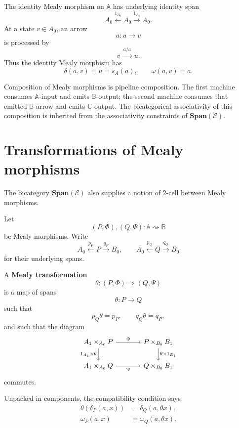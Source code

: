 The identity Mealy morphism on \(\mathbb A\) has underlying identity span
\[
A_0\xleftarrow{1_{A_0}}A_0\xrightarrow{1_{A_0}}A_0.
\]
At a state \(v\in A_0\), an arrow
\[
a:u\to v
\]
is processed by
\[
v
\xrightarrow{\;a/a\;}
u.
\]
Thus the identity Mealy morphism has
\[
\delta(a,v)=u=s_A(a),
\qquad
\omega(a,v)=a.
\]

\begin{remark}
\label{rem:pipeline-composition}
Composition of Mealy morphisms is pipeline composition. The first machine consumes \(\mathbb A\)-input and emits \(\mathbb B\)-output; the second machine consumes that emitted \(\mathbb B\)-arrow and emits \(\mathbb C\)-output. The bicategorical associativity of this composition is inherited from the associativity constraints of \(\mathbf{Span}(\mathcal E)\).
\end{remark}

\section{Transformations of Mealy morphisms}
\label{sec:transformations-of-mealy-morphisms}

The bicategory \(\mathbf{Span}(\mathcal E)\) also supplies a notion of 2-cell between Mealy morphisms.

Let
\[
(P,\Phi),(Q,\Psi):\mathbb A\rightsquigarrow\mathbb B
\]
be Mealy morphisms. Write
\[
A_0\xleftarrow{p_P}P\xrightarrow{q_P}B_0,
\qquad
A_0\xleftarrow{p_Q}Q\xrightarrow{q_Q}B_0
\]
for their underlying spans.

\begin{definition}
\label{def:mealy-transformation}
A \textbf{Mealy transformation}
\[
\theta:(P,\Phi)\Rightarrow(Q,\Psi)
\]
is a map of spans
\[
\theta:P\to Q
\]
such that
\[
p_Q\theta=p_P,
\qquad
q_Q\theta=q_P,
\]
and such that the diagram
\[
\begin{tikzcd}[column sep=large]
A_1\times_{A_0}P
\arrow[r, "\Phi"]
\arrow[d, "1_{A_1}\times\theta"']
&
P\times_{B_0}B_1
\arrow[d, "\theta\times 1_{B_1}"]
\\
A_1\times_{A_0}Q
\arrow[r, "\Psi"']
&
Q\times_{B_0}B_1
\end{tikzcd}
\]
commutes.
\end{definition}

Unpacked in components, the compatibility condition says
\begin{align}
\theta(\delta_P(a,x))
&=
\delta_Q(a,\theta x),
\label{eq:mealy-transformation-delta}
\\
\omega_P(a,x)
&=
\omega_Q(a,\theta x).
\label{eq:mealy-transformation-omega}
\end{align}

